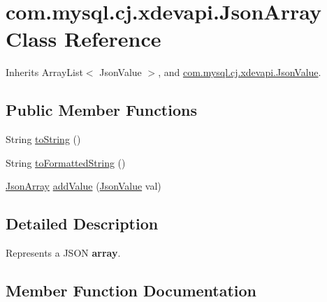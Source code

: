 \hypertarget{classcom_1_1mysql_1_1cj_1_1xdevapi_1_1_json_array}{}\section{com.\+mysql.\+cj.\+xdevapi.\+Json\+Array Class Reference}
\label{classcom_1_1mysql_1_1cj_1_1xdevapi_1_1_json_array}


Inherits Array\+List$<$ Json\+Value $>$, and \mbox{\hyperlink{interfacecom_1_1mysql_1_1cj_1_1xdevapi_1_1_json_value}{com.\+mysql.\+cj.\+xdevapi.\+Json\+Value}}.

\subsection*{Public Member Functions}
\begin{DoxyCompactItemize}
\item 
String \mbox{\hyperlink{classcom_1_1mysql_1_1cj_1_1xdevapi_1_1_json_array_ac8d01d1367f93b168dd760316a66d5fc}{to\+String}} ()
\item 
String \mbox{\hyperlink{classcom_1_1mysql_1_1cj_1_1xdevapi_1_1_json_array_a8a735ca15493e8154b46976ffb56204e}{to\+Formatted\+String}} ()
\item 
\mbox{\hyperlink{classcom_1_1mysql_1_1cj_1_1xdevapi_1_1_json_array}{Json\+Array}} \mbox{\hyperlink{classcom_1_1mysql_1_1cj_1_1xdevapi_1_1_json_array_ac85f74cda36896e22b0970d9768c738d}{add\+Value}} (\mbox{\hyperlink{interfacecom_1_1mysql_1_1cj_1_1xdevapi_1_1_json_value}{Json\+Value}} val)
\end{DoxyCompactItemize}


\subsection{Detailed Description}
Represents a J\+S\+ON {\bfseries array}. 

\subsection{Member Function Documentation}
\mbox{\label{classcom_1_1mysql_1_1cj_1_1xdevapi_1_1_json_array_ac85f74cda36896e22b0970d9768c738d}} 
